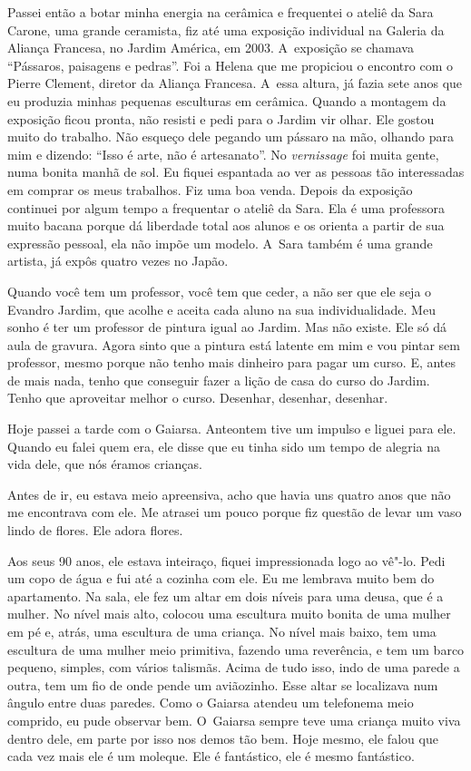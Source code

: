 Passei então a botar minha energia na cerâmica e frequentei o ateliê da
Sara Carone, uma grande ceramista, fiz até uma exposição individual na
Galeria da Aliança Francesa, no Jardim América, em 2003. A~exposição se
chamava ``Pássaros, paisagens e pedras''. Foi a Helena que me propiciou
o encontro com o Pierre Clement, diretor da Aliança Francesa. A~essa
altura, já fazia sete anos que eu produzia minhas pequenas esculturas em
cerâmica. Quando a montagem da exposição ficou pronta, não resisti e
pedi para o Jardim vir olhar. Ele gostou muito do trabalho. Não esqueço
dele pegando um pássaro na mão, olhando para mim e dizendo: ``Isso é
arte, não é artesanato''. No \emph{vernissage} foi muita gente, numa
bonita manhã de sol. Eu fiquei espantada ao ver as pessoas tão
interessadas em comprar os meus trabalhos. Fiz uma boa venda. Depois da
exposição continuei por algum tempo a frequentar o ateliê da Sara. Ela é
uma professora muito bacana porque dá liberdade total aos alunos e os
orienta a partir de sua expressão pessoal, ela não impõe um modelo. A~Sara também é uma grande artista, já expôs quatro vezes no Japão.

Quando você tem um professor, você tem que ceder, a não ser que ele seja
o Evandro Jardim, que acolhe e aceita cada aluno na sua individualidade.
Meu sonho é ter um professor de pintura igual ao Jardim. Mas não existe.
Ele só dá aula de gravura. Agora sinto que a pintura está latente em mim
e vou pintar sem professor, mesmo porque não tenho mais dinheiro para
pagar um curso. E, antes de mais nada, tenho que conseguir fazer a lição
de casa do curso do Jardim. Tenho que aproveitar melhor o curso.
Desenhar, desenhar, desenhar.

Hoje passei a tarde com o Gaiarsa. Anteontem tive um impulso e liguei
para ele. Quando eu falei quem era, ele disse que eu tinha sido um tempo
de alegria na vida dele, que nós éramos crianças.

Antes de ir, eu estava meio apreensiva, acho que havia uns quatro anos
que não me encontrava com ele. Me atrasei um pouco porque fiz questão de
levar um vaso lindo de flores. Ele adora flores.

Aos seus 90 anos, ele estava inteiraço, fiquei impressionada logo ao
vê"-lo. Pedi um copo de água e fui até a cozinha com ele. Eu me lembrava
muito bem do apartamento. Na sala, ele fez um altar em dois níveis para
uma deusa, que é a mulher. No nível mais alto, colocou uma escultura
muito bonita de uma mulher em pé e, atrás, uma escultura de uma criança.
No nível mais baixo, tem uma escultura de uma mulher meio primitiva,
fazendo uma reverência, e tem um barco pequeno, simples, com vários
talismãs. Acima de tudo isso, indo de uma parede a outra, tem um fio de
onde pende um aviãozinho. Esse altar se localizava num ângulo entre duas
paredes. Como o Gaiarsa atendeu um telefonema meio comprido, eu pude
observar bem. O~Gaiarsa sempre teve uma criança muito viva dentro dele,
em parte por isso nos demos tão bem. Hoje mesmo, ele falou que cada vez
mais ele é um moleque. Ele é fantástico, ele é mesmo fantástico.

